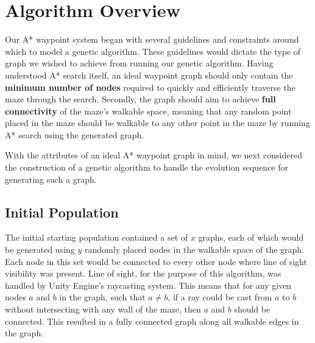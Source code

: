 \section{Algorithm Overview}
	Our A* waypoint system began with several guidelines and constraints around which to model a genetic algorithm. These guidelines would dictate the type of graph we wished to achieve from running our genetic algorithm. Having understood A* search itself, an ideal waypoint graph should only contain the \textbf{minimum number of nodes} required to quickly and efficiently traverse the maze through the search. Secondly, the graph should aim to achieve \textbf{full connectivity} of the maze's walkable space, meaning that any random point placed in the maze should be walkable to any other point in the maze by running A* search using the generated graph.
	
	With the attributes of an ideal A* waypoint graph in mind, we next considered the construction of a genetic algorithm to handle the evolution sequence for generating such a graph.
	
	\subsection{Initial Population}
	The initial starting population contained a set of \(x\) graphs, each of which would be generated using \(y\) randomly placed nodes in the walkable space of the graph. Each node in this set would be connected to every other node where line of sight visibility was present. Line of sight, for the purpose of this algorithm, was handled by Unity Engine's raycasting system. This means that for any given nodes \(a\) and \(b\) in the graph, such that \(a \neq b\), if a ray could be cast from \(a\) to \(b\) without intersecting with any wall of the maze, then \(a\) and \(b\) should be connected. This resulted in a fully connected graph along all walkable edges in the graph.
	
